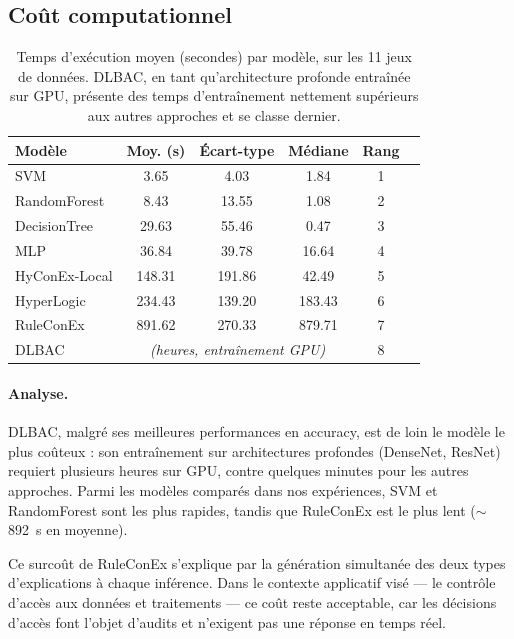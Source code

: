 \documentclass[12pt,a4paper]{article}
\begin{document}
\subsection{Coût computationnel}
\label{sec:temps}

\begin{table}[htbp]
  \centering
  \caption{Temps d'exécution moyen (secondes) par modèle, sur les 11 jeux de
           données. DLBAC, en tant qu'architecture profonde entraînée sur GPU,
           présente des temps d'entraînement nettement supérieurs aux autres
           approches et se classe dernier.}
  \label{tab:temps}
  \small
  \begin{tabular}{lccccc}
    \toprule
    \textbf{Modèle} & \textbf{Moy. (s)} & \textbf{Écart-type}
      & \textbf{Médiane} & \textbf{Rang} \\
    \midrule
    SVM          &     3.65 &     4.03 &     1.84 & 1 \\
    RandomForest &     8.43 &    13.55 &     1.08 & 2 \\
    DecisionTree &    29.63 &    55.46 &     0.47 & 3 \\
    MLP          &    36.84 &    39.78 &    16.64 & 4 \\
    HyConEx-Local &  148.31 &   191.86 &    42.49 & 5 \\
    HyperLogic   &   234.43 &   139.20 &   183.43 & 6 \\
    RuleConEx    &   891.62 &   270.33 &   879.71 & 7 \\
    DLBAC        & \multicolumn{3}{c}{\textit{(heures, entraînement GPU)}} & 8 \\
    \bottomrule
  \end{tabular}
\end{table}

\paragraph{Analyse.}
DLBAC, malgré ses meilleures performances en accuracy, est de loin le modèle
le plus coûteux : son entraînement sur architectures profondes (DenseNet,
ResNet) requiert plusieurs heures sur GPU, contre quelques minutes pour les
autres approches. Parmi les modèles comparés dans nos expériences, SVM et
RandomForest sont les plus rapides, tandis que RuleConEx est le plus lent
($\sim$892~s en moyenne).

Ce surcoût de RuleConEx s'explique par la génération simultanée des deux types
d'explications à chaque inférence. Dans le contexte applicatif visé --- le
contrôle d'accès aux données et traitements --- ce coût reste acceptable, car
les décisions d'accès font l'objet d'audits et n'exigent pas une réponse en
temps réel.
\end{document}
